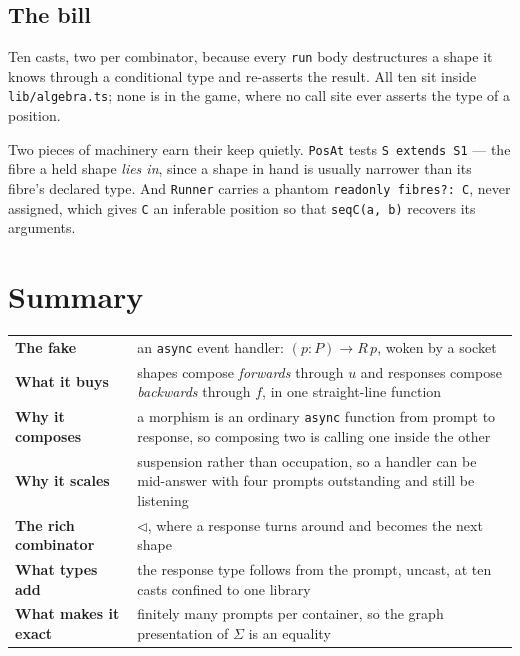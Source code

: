 \documentclass[11pt,a4paper]{article}
\begin{document}
\subsection*{The bill}

Ten casts, two per combinator, because every \texttt{run} body destructures a
shape it knows through a conditional type and re-asserts the result. All ten sit
inside \texttt{lib/algebra.ts}; none is in the game, where no call site ever
asserts the type of a position.

Two pieces of machinery earn their keep quietly. \texttt{PosAt} tests
\texttt{S extends S1} --- the fibre a held shape \emph{lies in}, since a shape in
hand is usually narrower than its fibre's declared type. And \texttt{Runner}
carries a phantom \texttt{readonly fibres?: C}, never assigned, which gives
\texttt{C} an inferable position so that \texttt{seqC(a, b)} recovers its
arguments.

\section*{Summary}

\begin{center}
\footnotesize
\begin{tabular}{@{}p{}p{}@{}}
\toprule
\textbf{The fake} & an \texttt{async} event handler: $(p : P) \to R\,p$, woken by a socket \\
\textbf{What it buys} & shapes compose \emph{forwards} through $u$ and responses
  compose \emph{backwards} through $f$, in one straight-line function \\
\textbf{Why it composes} & a morphism is an ordinary \texttt{async} function from
  prompt to response, so composing two is calling one inside the other \\
\textbf{Why it scales} & suspension rather than occupation, so a handler can be
  mid-answer with four prompts outstanding and still be listening \\
\textbf{The rich combinator} & $\lhd$, where a response turns around and becomes
  the next shape \\
\textbf{What types add} & the response type follows from the prompt, uncast, at
  ten casts confined to one library \\
\textbf{What makes it exact} & finitely many prompts per container, so the graph
  presentation of $\Sigma$ is an equality \\
\end{tabular}
\end{center}
\end{document}
